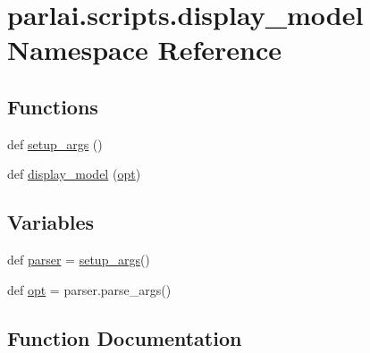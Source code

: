 \hypertarget{namespaceparlai_1_1scripts_1_1display__model}{}\section{parlai.\+scripts.\+display\+\_\+model Namespace Reference}
\label{namespaceparlai_1_1scripts_1_1display__model}
\subsection*{Functions}
\begin{DoxyCompactItemize}
\item 
def \hyperlink{namespaceparlai_1_1scripts_1_1display__model_a9141f8dde0f690b4d641fe08c193e2b5}{setup\+\_\+args} ()
\item 
def \hyperlink{namespaceparlai_1_1scripts_1_1display__model_a25488b354b0b8cbaee28b146b17c26f1}{display\+\_\+model} (\hyperlink{namespaceparlai_1_1scripts_1_1display__model_a53054dd9ddcd16817b6dde616a4236c5}{opt})
\end{DoxyCompactItemize}
\subsection*{Variables}
\begin{DoxyCompactItemize}
\item 
def \hyperlink{namespaceparlai_1_1scripts_1_1display__model_a34f269d469b91fcaf21a045c6f4a3598}{parser} = \hyperlink{namespaceparlai_1_1scripts_1_1display__model_a9141f8dde0f690b4d641fe08c193e2b5}{setup\+\_\+args}()
\item 
def \hyperlink{namespaceparlai_1_1scripts_1_1display__model_a53054dd9ddcd16817b6dde616a4236c5}{opt} = parser.\+parse\+\_\+args()
\end{DoxyCompactItemize}


\subsection{Function Documentation}
\mbox{\label{namespaceparlai_1_1scripts_1_1display__model_a25488b354b0b8cbaee28b146b17c26f1}} 
